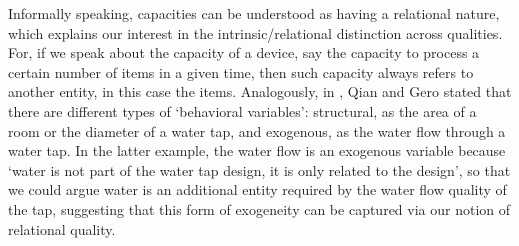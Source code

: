\documentclass[sw]{iosart2x}
\newcommand{\quotes}[1]{`#1'}
\begin{document}
Informally speaking, capacities can be understood as having a relational nature, which explains our interest in the intrinsic/relational distinction across qualities. For, if we speak about the capacity of a device, say the capacity to process a certain number of items in a given time, then such capacity always refers to another entity, in this case the items.  Analogously, in \cite{qianFunctionBehaviorStructure1996}, Qian and Gero stated that there are different types of \quotes{behavioral variables}: structural, as the area of a room or the diameter of a water tap, and exogenous, as the water flow through a water tap. In the latter example, the water flow is an exogenous variable because \quotes{water is not part of the
water tap design, it is only related to the design}, so that we could argue water is an additional entity required by the water flow quality of the tap, suggesting that this form of exogeneity can be captured via our notion of relational quality.  

\end{document}
